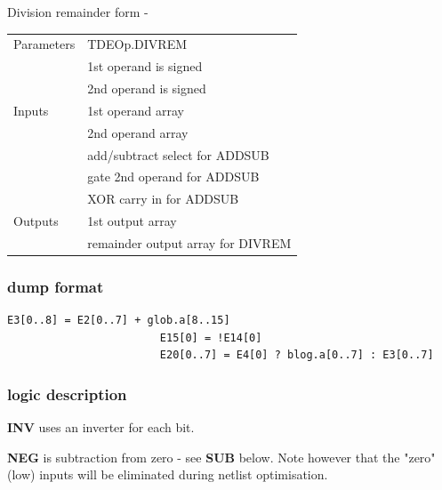 \documentclass[10pt,a4paper,twoside,fleqn]{book}
\begin{document}
                    Division remainder form - 

                    \begin{tabular}{| l | l |}
                    \hline
                    Parameters  & TDEOp.DIVREM \\
                                & 1st operand is signed \\
                                & 2nd operand is signed \\
                    \hline
                    Inputs      & 1st operand array \\
                                & 2nd operand array \\
                                & add/subtract select for ADDSUB \\
                                & gate 2nd operand for ADDSUB \\
                                & XOR carry in for ADDSUB \\
                    \hline
                    Outputs     & 1st output array \\
                                & remainder output array for DIVREM\\
                    \hline
                    \end{tabular}

                \subsubsection{dump format}

                    \begin{lstlisting}[gobble=20, language=tde]
                        E3[0..8] = E2[0..7] + glob.a[8..15]
                        E15[0] = !E14[0]
                        E20[0..7] = E4[0] ? blog.a[0..7] : E3[0..7]
                    \end{lstlisting}

                \subsubsection{logic description}
                
                    {\bf INV} uses an inverter for each bit.

                    {\bf NEG} is subtraction from zero - see {\bf SUB}
                    below. Note however that the "zero" (low) inputs
                    will be eliminated during netlist optimisation.  
\end{document}
